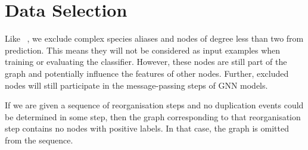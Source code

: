 \documentclass[
	fontsize=10pt, %
	twoside=true, %
	secnumdepth=1, %
  toc=indentunnumbered %
]{kaobook}
\begin{document}


\section{Data Selection}
\label{sec:data-selection}

Like \nielsen{}~\cite{nielsen_MachineLearningSupport_2019}, we exclude complex
species aliases and nodes of degree less than two from prediction. This means
they will not be considered as input examples when training or evaluating the
classifier. However, these nodes are still part of the graph and potentially
influence the features of other nodes. Further, excluded nodes will still
participate in the message-passing steps of GNN models.

If we are given a sequence of reorganisation steps and no duplication events could
be determined in some step, then the graph corresponding to that reorganisation
step contains no nodes with positive labels. In that case, the graph is omitted
from the sequence. 
\end{document}
